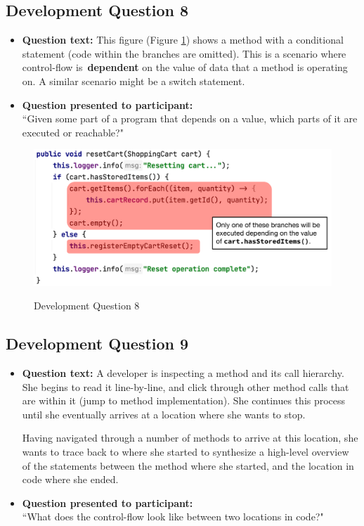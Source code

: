 \subsection{Development Question 8}

\begin{itemize}
  \item[] \textbf{Question text:} This figure (Figure \ref{fig:DS8}) shows a 
          method with a conditional statement (code within the branches are 
          omitted). This is a scenario where control-flow is \textbf{dependent} 
          on the value of data that a method is operating on. 
          A similar scenario might be a switch statement.
\item[] \textbf{Question presented to participant:}  \\
         ``Given some part of a program that depends on a value, which parts of 
         it are executed or reachable?"
\end{itemize}

\begin{figure}[ht!]
\centering
\caption{Development Question 8}
\includegraphics[width=\textwidth]{./figs/ds8.png}
\label{fig:DS8}
\end{figure}

\pagebreak

\subsection{Development Question 9}

\begin{itemize}
  \item[] \textbf{Question text:} A developer is inspecting a method and its 
          call hierarchy. She begins to read it line-by-line, and click through 
          other method calls that are within it (\eg jump to method 
          implementation). She continues this process until she eventually 
          arrives at a location where she wants to stop.

         \par Having navigated through a number of methods to arrive at this 
         location, she wants to trace back to where she started to synthesize a 
         high-level overview of the statements between the method where she 
         started, and the location in code where she ended.
  \item[] \textbf{Question presented to participant:}  \\
         ``What does the control-flow look like between two locations in code?"
\end{itemize}
